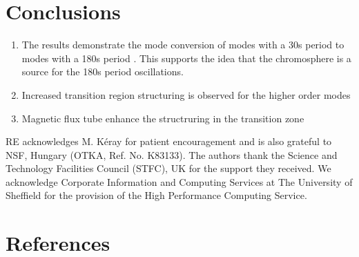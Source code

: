 \documentclass[final,1p]{elsarticle}
\begin{document}



\section{Conclusions}

   \begin{enumerate}
      \item The results demonstrate the mode conversion of modes with a 30s period to modes with a 180s period \cite{leibacher1982}. This supports the idea that the chromosphere is a source for the 180s period oscillations.
      \item Increased transition region structuring is observed for the higher order modes
      \item Magnetic flux tube enhance the structruring in the transition zone
   \end{enumerate}

\begin{acknowledgements}
RE acknowledges M. K\'eray for patient encouragement and is also grateful to NSF, Hungary (OTKA, Ref. No. K83133). 
The authors thank the Science and Technology Facilities Council (STFC), UK for the support they received. We acknowledge Corporate Information and Computing Services at The University of Sheffield for the provision of the High Performance Computing Service.
\end{acknowledgements}


\section{References}

%

\end{document}
